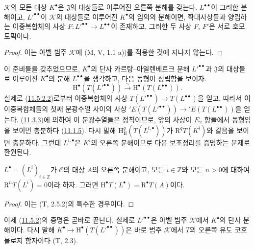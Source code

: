 \begin{corollary}[11.5.2.2]
\label{0.11.5.2.2-ko}
$\mathcal K$의 모든 대상 $K^\bullet$은 $\mathfrak J$의 대상들로
이루어진 오른쪽 분해를 갖는다. $L^{\bullet\bullet}$이 그러한
분해이고, $L'^{\bullet\bullet}$이 $\mathcal K$의 대상들로 이루어진
$K^\bullet$의 임의의 분해이면, 확대사상들과 양립하는 이중복합체의
사상 $F:L'^{\bullet\bullet}\to L^{\bullet\bullet}$이 존재하고, 그러한
두 사상 $F$, $F'$은 서로 호모토픽이다.
\end{corollary}

\begin{proof}
이는 아벨 범주 $\mathcal K$에 (M, V, 1.1 a))를 적용한 것에 지나지
않는다.
\end{proof}

\begin{env}[11.5.2.3]
\label{0.11.5.2.3-ko}
이 준비들을 갖추었으므로, $K^\bullet$의 단사 카르탕--아일렌베르크
분해 $L'^{\bullet\bullet}$과 $\mathfrak J$의 대상들로 이루어진
$K^\bullet$의 분해 $L^{\bullet\bullet}$을 생각하고, 다음 동형이
성립함을 보이자.
\[
  \mathrm H^\bullet(T(L'^{\bullet\bullet}))\xrightarrow{\sim}
  \mathrm H^\bullet(T(L^{\bullet\bullet})).
\]
실제로 (\hyperref[0.11.5.2.2-ko]{11.5.2.2})로부터 이중복합체의 사상
$T(L'^{\bullet\bullet})\to T(L^{\bullet\bullet})$을 얻고, 따라서 이
이중복합체들의 첫째 분광수열 사이의 사상
$'E(T(L'^{\bullet\bullet}))\to{}'E(T(L^{\bullet\bullet}))$을 얻는다.
(\hyperref[0.11.3.3-fr]{11.3.3})에 의하여 이 분광수열들은 정칙이므로,
앞의 사상이 $E_2$ 항들에서 동형임을 보이면 충분하다
(\hyperref[0.11.1.5-fr]{11.1.5}). 다시 말해
$\mathrm H_{\mathrm{II}}^q(T(L^{i,\bullet}))$가
$\mathrm R^qT(K^i)$와 같음을 보이면 충분하다. 그런데
$L^{i,\bullet}$은 $K^i$의 오른쪽 분해이므로 다음 보조정리를
증명하는 문제로 환원된다.
\end{env}

\begin{lemma}[11.5.2.4]
\label{0.11.5.2.4-ko}
$L^\bullet=(L^i)_{i\in\mathbb Z}$가 $\mathcal C$의 대상 $A$의 오른쪽
분해이고, 모든 $i\in\mathbb Z$와 모든 $n>0$에 대하여
$\mathrm R^nT(L^i)=0$이라 하자. 그러면
$\mathrm H^\bullet T(L^\bullet)=\mathrm R^\bullet T(A)$이다.
\end{lemma}

\begin{proof}
이는 (T, 2.5.2)의 특수한 경우이다.
\end{proof}

\begin{env}[11.5.2.5]
\label{0.11.5.2.5-ko}
이제 (\hyperref[0.11.5.2-ko]{11.5.2})의 증명은 곧바로 끝난다.
실제로 $L'^{\bullet\bullet}$은 아벨 범주 $\mathcal K$에서
$K^\bullet$의 단사 분해이다. 다시 말해
$K^\bullet\mapsto\mathrm H^\bullet(T(L'^{\bullet\bullet}))$은 바로
범주 $\mathcal K$에서 $T$의 오른쪽 유도 코호몰로지 함자이다
(T, 2.3).
\end{env}

